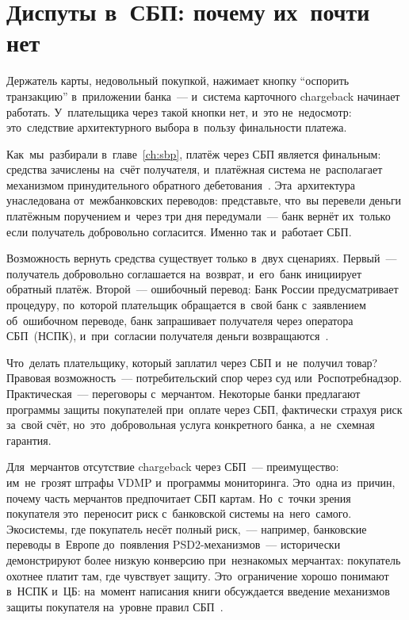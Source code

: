 \section{Диспуты в~СБП: почему их~почти нет}
\label{sec:disputes-sbp}

Держатель карты, недовольный покупкой, нажимает кнопку \enquote{оспорить
  транзакцию} в~приложении банка~--- и~система карточного chargeback начинает
работать. У~плательщика через  такой кнопки нет, и~это
не~недосмотр: это~следствие архитектурного выбора в~пользу финальности
платежа.

Как~мы~разбирали в~главе~\ref{ch:sbp}, платёж через СБП является
финальным: средства зачислены на~счёт получателя, и~платёжная система
не~располагает механизмом принудительного обратного дебетования~.
Эта~архитектура унаследована от~межбанковских переводов: представьте, что~вы
перевели деньги платёжным поручением и~через три дня передумали~---
банк вернёт их~только если получатель добровольно согласится. Именно так
и~работает СБП.

Возможность вернуть средства существует только в~двух сценариях. Первый~---
получатель добровольно соглашается на~возврат, и~его~банк инициирует
обратный платёж. Второй~--- ошибочный перевод: Банк России предусматривает
процедуру, по~которой плательщик обращается в~свой банк с~заявлением
об~ошибочном переводе, банк запрашивает получателя через оператора
СБП~(НСПК), и~при~согласии получателя деньги
возвращаются~.

Что~делать плательщику, который заплатил через СБП и~не~получил товар?
Правовая возможность~--- потребительский спор через суд или~Роспотребнадзор.
Практическая~--- переговоры с~мерчантом. Некоторые банки предлагают
программы защиты покупателей при~оплате через СБП, фактически страхуя
риск за~свой счёт, но~это~добровольная услуга конкретного банка, а~не~схемная
гарантия.

Для~мерчантов отсутствие chargeback через СБП~--- преимущество: им~не~грозят
штрафы VDMP и~программы мониторинга. Это~одна из~причин, почему часть
мерчантов предпочитает СБП картам. Но~с~точки зрения покупателя
это~переносит риск с~банковской системы на~него~самого. Экосистемы, где
покупатель несёт полный риск,~--- например, банковские переводы в~Европе
до~появления PSD2-механизмов~--- исторически демонстрируют более низкую
конверсию при~незнакомых мерчантах: покупатель охотнее платит там, где
чувствует защиту. Это~ограничение хорошо понимают в~НСПК и~ЦБ: на~момент
написания книги обсуждается введение механизмов защиты покупателя
на~уровне правил СБП~.



